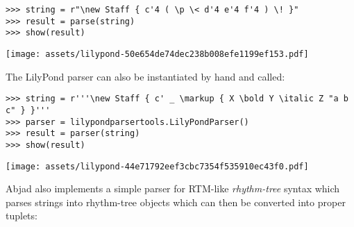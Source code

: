 \begin{abjadbookoutput}
\begin{singlespacing}
\vspace{-0.5\baselineskip}
\begin{verbatim}
>>> string = r"\new Staff { c'4 ( \p \< d'4 e'4 f'4 ) \! }"
>>> result = parse(string)
>>> show(result)
\end{verbatim}
\noindent\texttt{[image: assets/lilypond-50e654de74dec238b008efe1199ef153.pdf]}
\end{singlespacing}
\end{abjadbookoutput}

\noindent The LilyPond parser can also be instantiated by hand and called:

\begin{comment}
<abjad>
string = r'''\new Staff { c' _ \markup { X \bold Y \italic Z "a b c" } }'''
parser = lilypondparsertools.LilyPondParser()
result = parser(string)
show(result)
</abjad>
\end{comment}

\begin{abjadbookoutput}
\begin{singlespacing}
\vspace{-0.5\baselineskip}
\begin{verbatim}
>>> string = r'''\new Staff { c' _ \markup { X \bold Y \italic Z "a b c" } }'''
>>> parser = lilypondparsertools.LilyPondParser()
>>> result = parser(string)
>>> show(result)
\end{verbatim}
\noindent\texttt{[image: assets/lilypond-44e71792eef3cbc7354f535910ec43f0.pdf]}
\end{singlespacing}
\end{abjadbookoutput}

\noindent Abjad also implements a simple parser for RTM-like \emph{rhythm-tree}
syntax which parses strings into rhythm-tree objects which can then be
converted into proper tuplets:

\begin{comment}
<abjad>
rtm_parser = rhythmtreetools.RhythmTreeParser()
rtm_syntax = '(1 (1 (2 (1 -1 1)) -2))'
rtm_container = rtm_parser(rtm_syntax)[0]
abjad_container = rtm_container(Duration(1, 2))[0]
show(abjad_container)
</abjad>
\end{comment}

